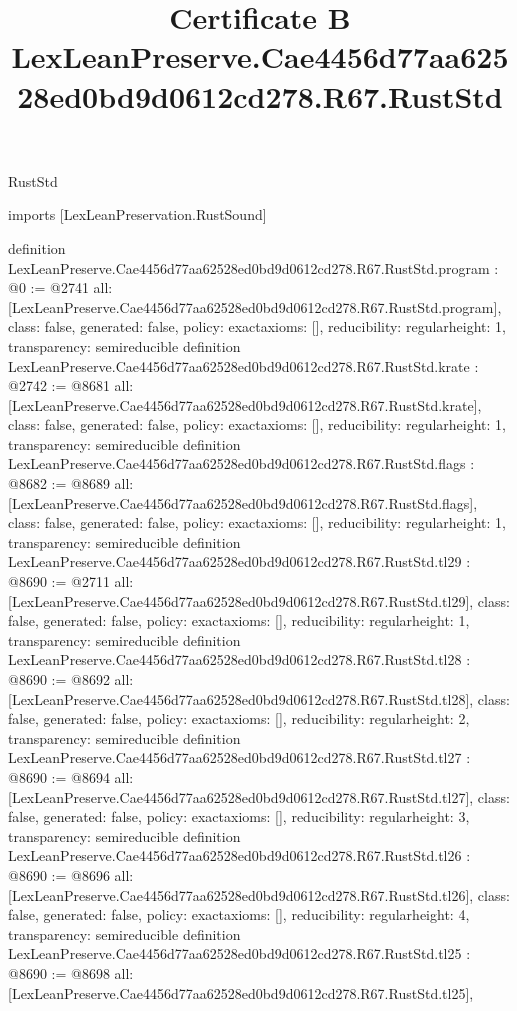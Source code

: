\begin{lexlean}{RustStd}
\title{Certificate B LexLeanPreserve.Cae4456d77aa62528ed0bd9d0612cd278.R67.RustStd}
\begin{coremodule}
imports [LexLeanPreservation.RustSound]

definition LexLeanPreserve.Cae4456d77aa62528ed0bd9d0612cd278.R67.RustStd.program : @0 := @2741 {
  all: [LexLeanPreserve.Cae4456d77aa62528ed0bd9d0612cd278.R67.RustStd.program],
  class: false,
  generated: false,
  policy: exact{axioms: []},
  reducibility: regular{height: 1},
  transparency: semireducible
}
definition LexLeanPreserve.Cae4456d77aa62528ed0bd9d0612cd278.R67.RustStd.krate : @2742 := @8681 {
  all: [LexLeanPreserve.Cae4456d77aa62528ed0bd9d0612cd278.R67.RustStd.krate],
  class: false,
  generated: false,
  policy: exact{axioms: []},
  reducibility: regular{height: 1},
  transparency: semireducible
}
definition LexLeanPreserve.Cae4456d77aa62528ed0bd9d0612cd278.R67.RustStd.flags : @8682 := @8689 {
  all: [LexLeanPreserve.Cae4456d77aa62528ed0bd9d0612cd278.R67.RustStd.flags],
  class: false,
  generated: false,
  policy: exact{axioms: []},
  reducibility: regular{height: 1},
  transparency: semireducible
}
definition LexLeanPreserve.Cae4456d77aa62528ed0bd9d0612cd278.R67.RustStd.tl29 : @8690 := @2711 {
  all: [LexLeanPreserve.Cae4456d77aa62528ed0bd9d0612cd278.R67.RustStd.tl29],
  class: false,
  generated: false,
  policy: exact{axioms: []},
  reducibility: regular{height: 1},
  transparency: semireducible
}
definition LexLeanPreserve.Cae4456d77aa62528ed0bd9d0612cd278.R67.RustStd.tl28 : @8690 := @8692 {
  all: [LexLeanPreserve.Cae4456d77aa62528ed0bd9d0612cd278.R67.RustStd.tl28],
  class: false,
  generated: false,
  policy: exact{axioms: []},
  reducibility: regular{height: 2},
  transparency: semireducible
}
definition LexLeanPreserve.Cae4456d77aa62528ed0bd9d0612cd278.R67.RustStd.tl27 : @8690 := @8694 {
  all: [LexLeanPreserve.Cae4456d77aa62528ed0bd9d0612cd278.R67.RustStd.tl27],
  class: false,
  generated: false,
  policy: exact{axioms: []},
  reducibility: regular{height: 3},
  transparency: semireducible
}
definition LexLeanPreserve.Cae4456d77aa62528ed0bd9d0612cd278.R67.RustStd.tl26 : @8690 := @8696 {
  all: [LexLeanPreserve.Cae4456d77aa62528ed0bd9d0612cd278.R67.RustStd.tl26],
  class: false,
  generated: false,
  policy: exact{axioms: []},
  reducibility: regular{height: 4},
  transparency: semireducible
}
definition LexLeanPreserve.Cae4456d77aa62528ed0bd9d0612cd278.R67.RustStd.tl25 : @8690 := @8698 {
  all: [LexLeanPreserve.Cae4456d77aa62528ed0bd9d0612cd278.R67.RustStd.tl25],
}
\end{coremodule}
\end{lexlean}
